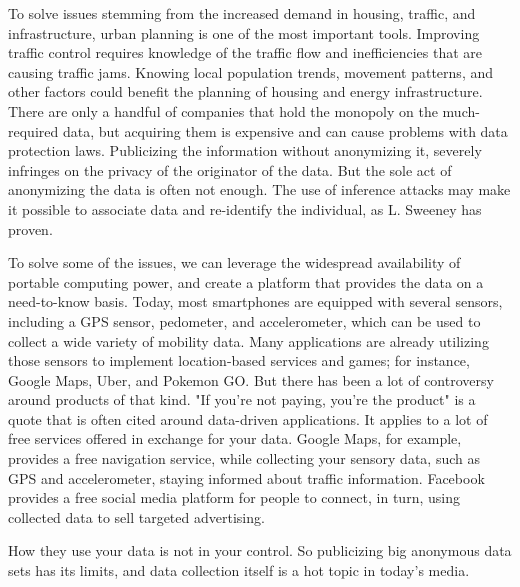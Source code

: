 To solve issues stemming from the increased demand in housing, traffic, and infrastructure, urban planning is one of the most important tools. Improving traffic control requires knowledge of the traffic flow and inefficiencies that are causing traffic jams. Knowing local population trends, movement patterns, and other factors could benefit the planning of housing and energy infrastructure. There are only a handful of companies that hold the monopoly on the much-required data, but acquiring them is expensive and can cause problems with data protection laws. Publicizing the information without anonymizing it, severely infringes on the privacy of the originator of the data. But the sole act of anonymizing the data is often not enough. The use of inference attacks may make it possible to associate data and re-identify the individual, as L. Sweeney has proven.

To solve some of the issues, we can leverage the widespread availability of portable computing power, and create a platform that provides the data on a need-to-know basis. Today, most smartphones are equipped with several sensors, including a GPS sensor, pedometer, and accelerometer, which can be used to collect a wide variety of mobility data. Many applications are already utilizing those sensors to implement location-based services and games; for instance, Google Maps, Uber, and Pokemon GO. But there has been a lot of controversy around products of that kind. "If you're not paying, you're the product" is a quote that is often cited around data-driven applications.
It applies to a lot of free services offered in exchange for your data. Google Maps, for example, provides a free navigation service, while collecting your sensory data, such as GPS and accelerometer, staying informed about traffic information. Facebook provides a free social media platform for people to connect, in turn, using collected data to sell targeted advertising.

How they use your data is not in your control. So publicizing big anonymous data sets has its limits, and data collection itself is a hot topic in today's media. 

